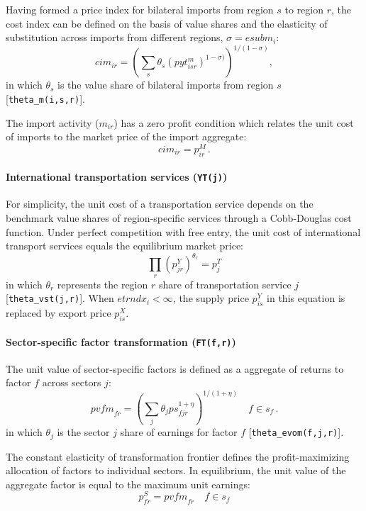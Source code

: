 Having formed a price index for bilateral imports from region $s$ to region $r$, the \CES cost index can be defined on the basis of value shares and the elasticity of substitution across imports from different regions, $\sigma = \textit{esubm}_i$:
$$\textit{cim}_{ir} = \left(\sum_s \theta_s (pyt^m_{isr})^{1-\sigma)}
\right)^{1/(1-\sigma)} ,$$ in which $\theta_s$ is the value share of bilateral imports from region $s$ [{\small \texttt{theta\_m(i,s,r)}}].

The import activity ($m_{ir}$) has a zero profit condition which relates the unit cost of imports to the market price of the import aggregate:
\begin{equation}
cim_{ir} = p^M_{ir}\,.
\end{equation}

\paragraph{\bf International transportation services (\texttt{YT(j)})}

For simplicity, the unit cost of a transportation service depends on the benchmark value shares of region-specific services through a Cobb-Douglas cost function.
Under perfect competition with free entry, the unit cost of international transport services equals the equilibrium market price:
\begin{equation}
\prod_r (p^Y_{jr})^{\theta_r} = p^T_j
\end{equation}
in which $\theta_r$ represents the region $r$ share of transportation service $j$ [{\small \texttt{theta\_vst(j,r)}}].
When $\textit{etrndx}_{i}<\infty$, the supply price $p^Y_{is}$ in this equation is replaced by export price $p^X_{is}$.

\paragraph{\bf Sector-specific factor transformation (\texttt{FT(f,r)})}

The unit value of sector-specific factors is defined as a \CET aggregate of returns to factor $f$ across sectors $j$:
$$\textit{pvfm}_{fr} = \left( \sum_j \theta_j ps_{fjr}^{1+\eta}
\right)^{1/(1+\eta)} \quad f \in s_{f}\,.$$ in which $\theta_j$ is the sector $j$ share of earnings for factor $f$ [{\small \texttt{theta\_evom(f,j,r)}}].

The constant elasticity of transformation frontier defines the profit-maximizing allocation of factors to individual sectors.
In equilibrium, the unit value of the aggregate factor is equal to the maximum unit earnings:
\begin{equation}
p^S_{fr} = \textit{pvfm}_{fr} \quad f \in s_f
\end{equation}

